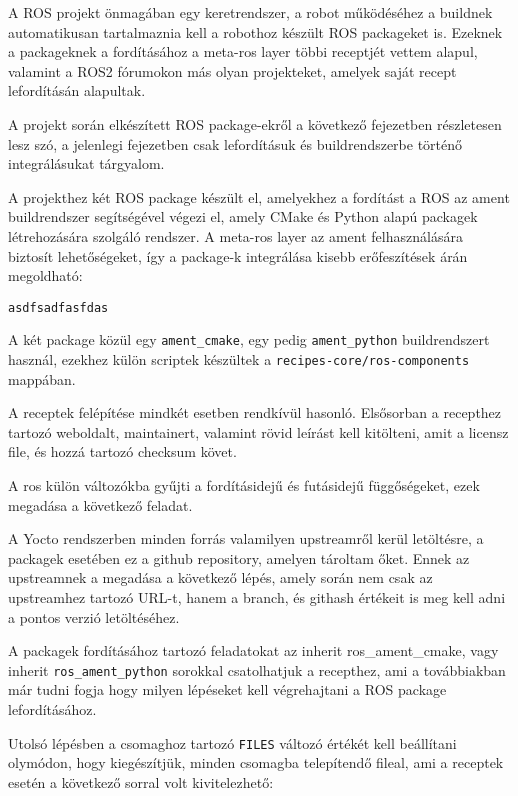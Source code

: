 A ROS projekt önmagában egy keretrendszer, a robot működéséhez a buildnek
automatikusan tartalmaznia kell a robothoz készült ROS packageket is. Ezeknek a
packageknek a fordításához a meta-ros layer többi receptjét vettem alapul,
valamint a ROS2 fórumokon más olyan projekteket, amelyek saját recept
lefordításán alapultak.

A projekt során elkészített ROS package-ekről a következő fejezetben részletesen
lesz szó, a jelenlegi fejezetben csak lefordításuk és buildrendszerbe történő
integrálásukat tárgyalom.

A projekthez két ROS package készült el, amelyekhez a fordítást a ROS az ament
buildrendszer segítségével végezi el, amely CMake és Python alapú packagek
létrehozására szolgáló rendszer. A meta-ros layer az ament felhasználására
biztosít lehetőségeket, így a package-k integrálása kisebb erőfeszítések árán
megoldható: 


\begin{verbatim}
asdfsadfasfdas
\end{verbatim}

A két package közül egy \verb|ament_cmake|, egy pedig \verb|ament_python|
buildrendszert használ, ezekhez külön scriptek készültek a
\verb|recipes-core/ros-components| mappában.

A receptek felépítése mindkét esetben rendkívül hasonló. Elsősorban a recepthez
tartozó weboldalt, maintainert, valamint rövid leírást kell kitölteni, amit a
licensz file, és hozzá tartozó checksum követ.

A ros külön változókba gyűjti a fordításidejű és futásidejű függőségeket, ezek
megadása a következő feladat. 

A Yocto rendszerben minden forrás valamilyen upstreamről kerül letöltésre, a
packagek esetében ez a github repository, amelyen tároltam őket. Ennek az
upstreamnek a megadása a következő lépés, amely során nem csak az upstreamhez
tartozó URL-t, hanem a branch, és githash értékeit is meg kell adni a pontos
verzió letöltéséhez. 

A packagek fordításához tartozó feladatokat az inherit ros\_ament\_cmake, vagy
inherit \verb|ros_ament_python| sorokkal csatolhatjuk a recepthez, ami a továbbiakban
már tudni fogja hogy milyen lépéseket kell végrehajtani a ROS package
lefordításához.

Utolsó lépésben a csomaghoz tartozó \verb|FILES| változó értékét kell beállítani
olymódon, hogy kiegészítjük, minden csomagba telepítendő fileal, ami a receptek
esetén a következő sorral volt kivitelezhető:


